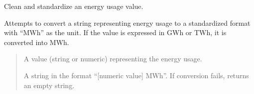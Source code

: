 \documentclass[letterpaper,10pt,english]{sphinxmanual}
\begin{document}
\begin{fulllineitems}
\label{\detokenize{autoapi/modules/output/data_clean/index:modules.output.data_clean.clean_energy_value}}
\pysigstartsignatures
\pysiglinewithargsret
{}
{}
{}
\pysigstopsignatures
\sphinxAtStartPar
Clean and standardize an energy usage value.

\sphinxAtStartPar
Attempts to convert a string representing energy usage to a standardized format with “MWh” as the unit.
If the value is expressed in GWh or TWh, it is converted into MWh.
\begin{quote}\begin{description}
\sphinxAtStartPar
{} \textendash{} A value (string or numeric) representing the energy usage.

\sphinxAtStartPar
A string in the format “{[}numeric value{]} MWh”. If conversion fails, returns an empty string.

\end{description}\end{quote}

\end{fulllineitems}


\begin{fulllineitems}
\label{\detokenize{autoapi/modules/output/data_clean/index:modules.output.data_clean.valid_units}}
\pysigstartsignatures
\pysigline
{}
\pysigstopsignatures
\end{fulllineitems}

\end{document}
